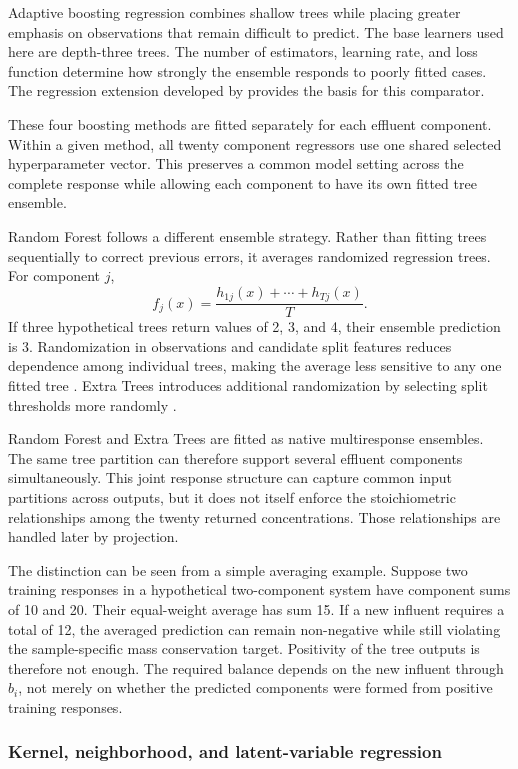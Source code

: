 Adaptive boosting regression combines shallow trees while placing greater emphasis on observations that remain difficult to predict. The base learners used here are depth-three trees. The number of estimators, learning rate, and loss function determine how strongly the ensemble responds to poorly fitted cases. The regression extension developed by \citet{Drucker1997} provides the basis for this comparator.

These four boosting methods are fitted separately for each effluent component. Within a given method, all twenty component regressors use one shared selected hyperparameter vector. This preserves a common model setting across the complete response while allowing each component to have its own fitted tree ensemble.

Random Forest follows a different ensemble strategy. Rather than fitting trees sequentially to correct previous errors, it averages randomized regression trees. For component $j$,
\[
f_j(x)=\frac{h_{1j}(x)+\cdots+h_{Tj}(x)}{T}.
\]
If three hypothetical trees return values of 2, 3, and 4, their ensemble prediction is 3. Randomization in observations and candidate split features reduces dependence among individual trees, making the average less sensitive to any one fitted tree \citep{Breiman2001}. Extra Trees introduces additional randomization by selecting split thresholds more randomly \citep{Geurts2006}.

Random Forest and Extra Trees are fitted as native multiresponse ensembles. The same tree partition can therefore support several effluent components simultaneously. This joint response structure can capture common input partitions across outputs, but it does not itself enforce the stoichiometric relationships among the twenty returned concentrations. Those relationships are handled later by projection.

The distinction can be seen from a simple averaging example. Suppose two training responses in a hypothetical two-component system have component sums of 10 and 20. Their equal-weight average has sum 15. If a new influent requires a total of 12, the averaged prediction can remain non-negative while still violating the sample-specific mass conservation target. Positivity of the tree outputs is therefore not enough. The required balance depends on the new influent through $b_i$, not merely on whether the predicted components were formed from positive training responses.

\subsubsection{Kernel, neighborhood, and latent-variable regression}

